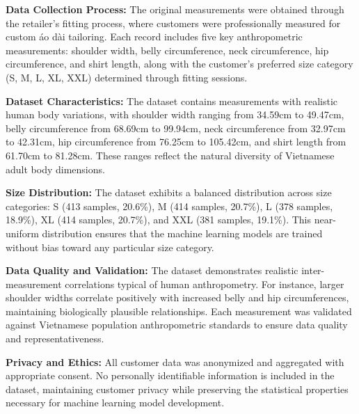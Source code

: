 \documentclass{llncs}
\begin{document}
\textbf{Data Collection Process:} The original measurements were obtained through the retailer's fitting process, where customers were professionally measured for custom áo dài tailoring. Each record includes five key anthropometric measurements: shoulder width, belly circumference, neck circumference, hip circumference, and shirt length, along with the customer's preferred size category (S, M, L, XL, XXL) determined through fitting sessions.

\textbf{Dataset Characteristics:} The dataset contains measurements with realistic human body variations, with shoulder width ranging from 34.59cm to 49.47cm, belly circumference from 68.69cm to 99.94cm, neck circumference from 32.97cm to 42.31cm, hip circumference from 76.25cm to 105.42cm, and shirt length from 61.70cm to 81.28cm. These ranges reflect the natural diversity of Vietnamese adult body dimensions.

\textbf{Size Distribution:} The dataset exhibits a balanced distribution across size categories: S (413 samples, 20.6\%), M (414 samples, 20.7\%), L (378 samples, 18.9\%), XL (414 samples, 20.7\%), and XXL (381 samples, 19.1\%). This near-uniform distribution ensures that the machine learning models are trained without bias toward any particular size category.

\textbf{Data Quality and Validation:} The dataset demonstrates realistic inter-measurement correlations typical of human anthropometry. For instance, larger shoulder widths correlate positively with increased belly and hip circumferences, maintaining biologically plausible relationships. Each measurement was validated against Vietnamese population anthropometric standards to ensure data quality and representativeness.

\textbf{Privacy and Ethics:} All customer data was anonymized and aggregated with appropriate consent. No personally identifiable information is included in the dataset, maintaining customer privacy while preserving the statistical properties necessary for machine learning model development.
\end{document}

